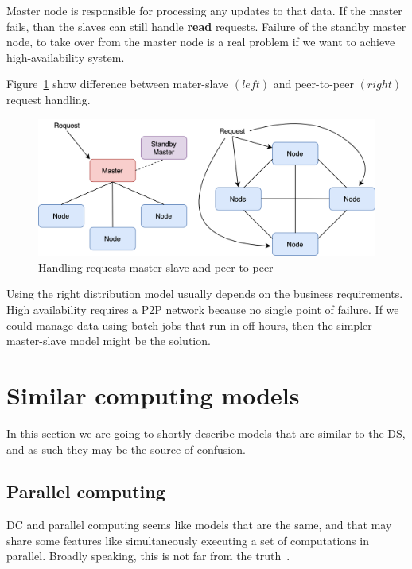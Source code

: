 Master node is responsible for processing any updates to that data. If the master fails, than  the slaves can still handle \textbf{read} requests. Failure of the standby master node, to take over from the master node is a real problem if we want to achieve high-availability system.

Figure~\ref{fig:fig16} show difference between mater-slave $(left)$ and peer-to-peer $(right)$ request handling.

\begin{figure}[H]
	\begin{center}
		\includegraphics[scale=0.7]{images/Figure16.png}
	\end{center}
	\vspace{-0.6cm}
	\caption{Handling requests master-slave and peer-to-peer}
	\label{fig:fig16}
\end{figure}

Using the right distribution model usually depends on the business requirements. High availability requires a P2P network because no single point of failure. If we could manage data using batch jobs that run in off hours, then the simpler master-slave model might be the solution.
%
%
\section{Similar computing models}\label{sec:similar_models}
%
In this section we are going to shortly describe models that are similar to the DS, and as such they may be the source of confusion.
%
%
\subsection{Parallel computing}\label{sec:parallel_computing}
%
DC and parallel computing seems like models that are the same, and that may share some features like simultaneously executing a set of computations in parallel. Broadly speaking, this is not far from the truth~\cite{Vera16}. 

